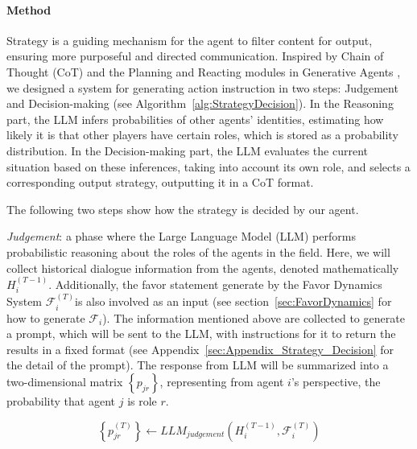 \documentclass[11pt]{article}
\begin{document}
\paragraph{Method} Strategy is a guiding mechanism for the agent to filter content for output, ensuring more purposeful and directed communication. Inspired by Chain of Thought (CoT) \citep{wei2022chain} and the Planning and Reacting modules in Generative Agents \citep{park2023generative}, we designed a system for generating action instruction in two steps: Judgement and Decision-making (see Algorithm~\ref{alg:StrategyDecision}). In the Reasoning part, the LLM infers probabilities of other agents' identities, estimating how likely it is that other players have certain roles, which is stored as a probability distribution. In the Decision-making part, the LLM evaluates the current situation based on these inferences, taking into account its own role, and selects a corresponding output strategy, outputting it in a CoT format.

The following two steps show how the strategy is decided by our agent.

\textit{Judgement}: \label{sec:strategy_judgement} a phase where the Large Language Model (LLM) performs probabilistic reasoning about the roles of the agents in the field. Here, we will collect historical dialogue information from the agents, denoted mathematically $ H_i^{(T-1)} $. Additionally, the favor statement generate by the Favor Dynamics System $ \mathcal{F}_i^{(T)} $is also involved as an input (see section~\ref{sec:FavorDynamics} for how to generate $ \mathcal{F}_i $). The information mentioned above are collected to generate a prompt, which will be sent to the LLM, with instructions for it to return the results in a fixed format (see Appendix~\ref{sec:Appendix_Strategy_Decision} for the detail of the prompt). The response from LLM will be summarized into a two-dimensional matrix $ \left\{ p_{jr} \right\} $, representing from agent $ i $'s perspective, the probability that agent $ j $ is role $ r $.

\begin{equation}
  \left\{ p_{jr}^{(T)} \right\}\leftarrow LLM_{judgement}(H_i^{(T-1)},\mathcal{F}_i^{(T)}) 
  \label{eq:strategy_LLM_Judge}
\end{equation}
\end{document}
